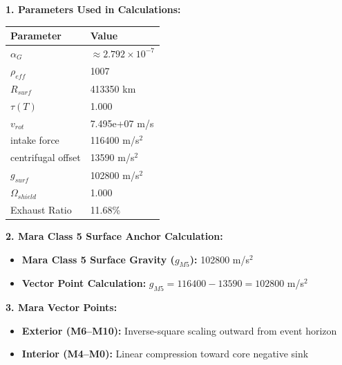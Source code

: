 \documentclass[11pt, a4paper]{article}
\begin{document}
\vspace{0.5em}
\noindent \textbf{1. Parameters Used in Calculations:}
\begin{center}
  \begin{tabular}{|l|l|}
    \hline
    \textbf{Parameter} & \textbf{Value} \\ \hline
    $\alpha_G$ & $\approx 2.792 \times 10^{-7}$ \\ \hline
    $\rho_{eff}$ & 1007 \\ \hline
    $R_{surf}$ & 413350 km \\ \hline
    $\tau(T)$ & 1.000 \\ \hline
    $v_{rot}$ & 7.495e+07 m/s \\ \hline
    intake force & 116400 m/s$^2$ \\ \hline
    centrifugal offset & 13590 m/s$^2$ \\ \hline
    $g_{surf}$ & 102800 m/s$^2$ \\ \hline
    $\Omega_{shield}$ & 1.000 \\ \hline
    Exhaust Ratio & 11.68\% \\ \hline
  \end{tabular}
\end{center}

\vspace{0.5em}
\noindent \textbf{2. Mara Class 5 Surface Anchor Calculation:}
\begin{itemize}
  \item \textbf{Mara Class 5 Surface Gravity ($g_{M5}$):} 102800 m/s$^2$
  \item \textbf{Vector Point Calculation:} $g_{M5} = 116400 - 13590 = 102800$ m/s$^2$
\end{itemize}

\vspace{0.5em}
\noindent \textbf{3. Mara Vector Points:}
\begin{itemize}
  \item \textbf{Exterior (M6--M10):} Inverse-square scaling outward from event horizon
  \item \textbf{Interior (M4--M0):} Linear compression toward core negative sink
\end{itemize}
\end{document}
